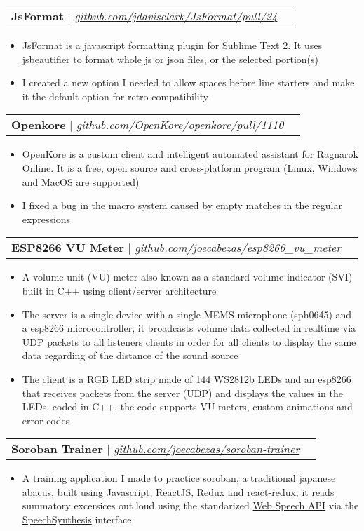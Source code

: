 \documentclass[letterpaper,11pt]{article}
\makeatletter
\newcommand{\resumeItem}[1]{
  \item\small{
    {#1 \vspace{-2pt}}
  }
}
\newcommand{\resumeProjectHeading}[2]{
    \vspace{-2pt}\item
    \begin{tabular*}{0.97\textwidth}{l@{\extracolsep{\fill}}r}
      \small#1 & #2 \\
    \end{tabular*}\vspace{-7pt}
}
\newcommand{\resumeItemListStart}{\begin{itemize}}
\newcommand{\resumeItemListEnd}{\end{itemize}\vspace{-5pt}}
\makeatother
\begin{document}
      \resumeProjectHeading
        {\textbf{JsFormat} $|$ \emph{\href{https://github.com/jdavisclark/JsFormat/pull/24}{\color{blue}github.com/jdavisclark/JsFormat/pull/24}}}{}
          \resumeItemListStart
            \resumeItem{JsFormat is a javascript formatting plugin for Sublime Text 2. It uses jsbeautifier to format whole js or json files, or the selected portion(s)}
            \resumeItem{I created a new option I needed to allow spaces before line starters and make it the default option for retro compatibility}
          \resumeItemListEnd
      
      \resumeProjectHeading
        {\textbf{Openkore} $|$ \emph{\href{https://github.com/OpenKore/openkore/pull/1110}{\color{blue}github.com/OpenKore/openkore/pull/1110}}}{}
          \resumeItemListStart
            \resumeItem{OpenKore is a custom client and intelligent automated assistant for Ragnarok Online. It is a free, open source and cross-platform program (Linux, Windows and MacOS are supported)}
            \resumeItem{I fixed a bug in the macro system caused by empty matches in the regular expressions}
          \resumeItemListEnd
      
      \resumeProjectHeading
        {\textbf{ESP8266 VU Meter} $|$ \emph{\href{https://github.com/joecabezas/esp8266\_vu\_meter}{\color{blue}github.com/joecabezas/esp8266\_vu\_meter}}}{}
          \resumeItemListStart
            \resumeItem{A volume unit (VU) meter also known as a standard volume indicator (SVI) built in C++ using client/server architecture}
            \resumeItem{The server is a single device with a single MEMS microphone (sph0645) and a esp8266 microcontroller, it broadcasts volume data collected in realtime via UDP packets to all listeners clients in order for all clients to display the same data regarding of the distance of the sound source}
            \resumeItem{The client is a RGB LED strip made of 144 WS2812b LEDs and an esp8266 that receives packets from the server (UDP) and displays the values in the LEDs, coded in C++, the code supports VU meters, custom animations and error codes}
          \resumeItemListEnd
      
      \resumeProjectHeading
        {\textbf{Soroban Trainer} $|$ \emph{\href{https://github.com/joecabezas/soroban-trainer}{\color{blue}github.com/joecabezas/soroban-trainer}}}{}
          \resumeItemListStart
            \resumeItem{A training application I made to practice soroban, a traditional japanese abacus, built using Javascript, ReactJS, Redux and react-redux, it reads summatory excersices out loud using the standarized \href{https://developer.mozilla.org/en-US/docs/Web/API/Web_Speech_API}{\color{blue}Web Speech API} via the \href{https://developer.mozilla.org/en-US/docs/Web/API/SpeechSynthesis}{\color{blue}SpeechSynthesis} interface}
          \resumeItemListEnd
      
\end{document}
